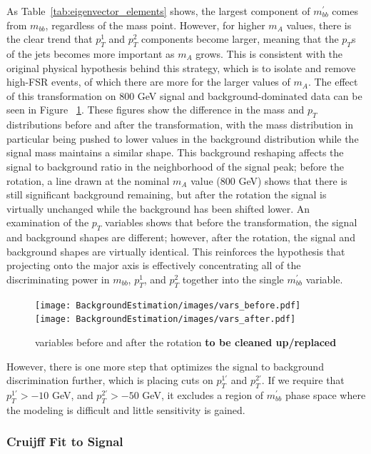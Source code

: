 As Table~\ref{tab:eigenvector_elements} shows, the largest component of
$m_{bb}^{'}$ comes from $m_{bb}$, regardless of the mass point.  However,
for higher $m_A$ values, there is the clear trend that $p_T^1$ and $p_T^2$
components become larger, meaning that the $p_T$s of the jets becomes 
more important as $m_A$ grows.  This is consistent with the original 
physical hypothesis behind this strategy, which is to isolate and remove
high-FSR events, of which there are more for the larger values of $m_A$. 
The effect of this transformation on 800 GeV signal and background-dominated
data can be seen in Figure ~\ref{fig:transformed_vars}.  These figures show
the difference in the mass and $p_T$ distributions before and after the transformation,
with the mass distribution in particular being pushed to lower values
in the background distribution while the signal mass maintains a similar shape.  
This background reshaping affects the signal to background ratio in the 
neighborhood of the signal peak; before the rotation,
a line drawn at the nominal $m_A$ value (800 GeV) shows that there is still
significant background remaining, but after the rotation the signal is virtually
unchanged while the background has been shifted lower.  An examination of the
$p_T$ variables shows that before the transformation, the signal and background
shapes are different; however, after the rotation, the signal and background
shapes are virtually identical.  This reinforces the hypothesis that projecting
onto the major axis is effectively concentrating all of the discriminating 
power in $m_{bb}$, $p_T^1$, and $p_T^2$ together into the single $m_{bb}^{'}$
variable.  

\begin{figure}[hbt]
\texttt{[image: BackgroundEstimation/images/vars\_before.pdf]}
\texttt{[image: BackgroundEstimation/images/vars\_after.pdf]}
\caption{variables before and after the rotation \textbf{to be cleaned up/replaced} \label{fig:transformed_vars}}
\end{figure}

However, there is one more step that optimizes the signal to background
discrimination further, which is placing cuts on $p_T^{1'}$ and $p_T^{2'}$.
If we require that $p_T^{1'}>-10$ GeV, and $p_T^{2'}>-50$ GeV, it 
excludes a region of $m_{bb}^{'}$ phase space where the modeling is difficult
and little sensitivity is gained.  








\subsubsection{Cruijff Fit to Signal}

